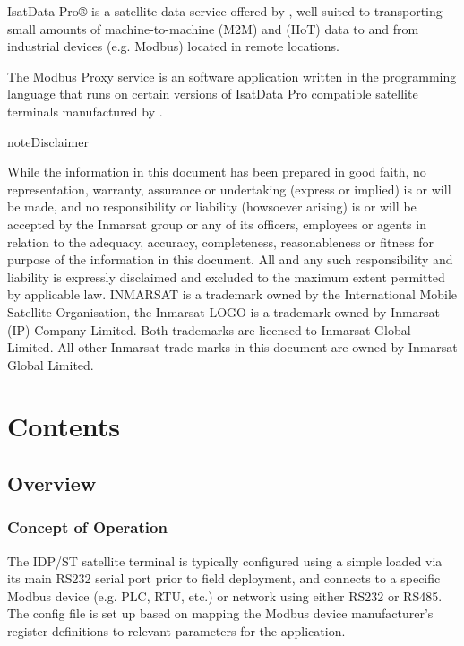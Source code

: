 \documentclass[letterpaper,10pt,english]{sphinxmanual}
\begin{document}
IsatData Pro® is a  satellite data service offered by , well suited to transporting small amounts of machine-to-machine (M2M) and  (IIoT) data to and from industrial devices (e.g. Modbus) located in remote locations.

The Modbus Proxy service is an  software application written in the  programming language that runs on certain versions of IsatData Pro compatible satellite terminals manufactured by .

\begin{sphinxadmonition}{note}{Disclaimer}

While the information in this document has been prepared in good faith, no representation, warranty, assurance or undertaking (express or implied) is or will be made, and no responsibility or liability (howsoever arising) is or will be accepted by the Inmarsat group or any of its officers, employees or agents in relation to the adequacy, accuracy, completeness, reasonableness or fitness for purpose of the information in this document. All and any such responsibility and liability is expressly disclaimed and excluded to the maximum extent permitted by applicable law. INMARSAT is a trademark owned by the International Mobile Satellite Organisation, the Inmarsat LOGO is a trademark owned by Inmarsat (IP) Company Limited. Both trademarks are licensed to Inmarsat Global Limited. All other Inmarsat trade marks in this document are owned by Inmarsat Global Limited.
\end{sphinxadmonition}


\chapter{Contents}
\label{\detokenize{index:contents}}

\section{Overview}
\label{\detokenize{overview:overview}}\label{\detokenize{overview::doc}}

\subsection{Concept of Operation}
\label{\detokenize{overview:concept-of-operation}}
The IDP/ST satellite terminal is typically configured using a simple  loaded via its main RS232 serial port prior to field deployment, and connects to a specific Modbus device (e.g. PLC, RTU, etc.) or network using either RS232 or RS485.  The config file is set up based on mapping the Modbus device manufacturer’s register definitions to relevant parameters for the application.
\end{document}
